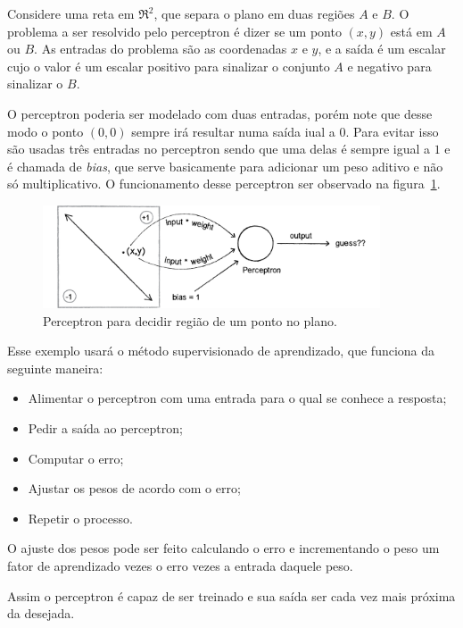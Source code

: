 Considere uma reta em $\Re^2$, que separa o plano em duas regiões $A$ e $B$. O problema a
ser resolvido pelo perceptron é dizer se um ponto $(x,y)$ está em $A$ ou $B$. As entradas do
problema são as coordenadas $x$ e $y$, e a saída é um escalar cujo o valor é um escalar positivo
para sinalizar o conjunto $A$ e negativo para sinalizar o $B$.

O perceptron poderia ser modelado com duas entradas, porém note que desse modo o
ponto $(0,0)$ sempre irá resultar numa saída iual a $0$. Para evitar isso são usadas três entradas
no perceptron sendo que uma delas é sempre igual a $1$ e é chamada de \emph{bias}, que serve
basicamente para adicionar um peso aditivo e não só multiplicativo. O funcionamento desse perceptron
ser observado na figura~\ref{fig:rede_neural_simple_problem}.

\begin{figure}[H]
\centering
\includegraphics[width=10cm]{figuras/rede_neural_simple_problem}
\caption{Perceptron para decidir região de um ponto no plano.}\label{fig:rede_neural_simple_problem}
\end{figure}

Esse exemplo usará o método supervisionado de aprendizado, que funciona da seguinte maneira:

\begin{itemize}
\item
  Alimentar o perceptron com uma entrada para o qual se conhece a resposta;
\item
  Pedir a saída ao perceptron;
\item
  Computar o erro;
\item
  Ajustar os pesos de acordo com o erro;
\item
  Repetir o processo.
\end{itemize}

O ajuste dos pesos pode ser feito calculando o erro e incrementando o peso um fator de
aprendizado vezes o erro vezes a entrada daquele peso.

Assim o perceptron é capaz de ser treinado e sua saída ser cada vez mais próxima da desejada.


